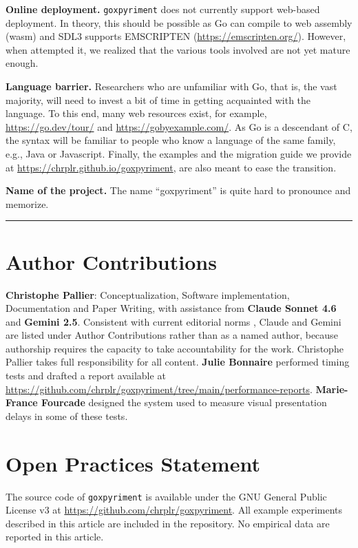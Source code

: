 \documentclass[jou,a4paper]{apa7}
\begin{document}
\textbf{Online deployment.} \texttt{goxpyriment} does not currently
support web-based deployment. In theory, this should be possible as Go
can compile to web assembly (wasm) and SDL3 supports EMSCRIPTEN
(\url{https://emscripten.org/}). However, when attempted it, we realized that
the various tools involved are not yet mature enough.

\textbf{Language barrier.}  Researchers who are unfamiliar with Go,
that is, the vast majority, will need to invest a bit of time in
getting acquainted with the language.  To this end, many web resources
exist, for example, \url{https://go.dev/tour/} and
\url{https://gobyexample.com/}. As Go is a descendant of C, the syntax
will be familiar to people who know a language of the same family,
e.g., Java or Javascript. Finally, the examples and the migration guide
we provide at \url{https://chrplr.github.io/goxpyriment}, are also
meant to ease the transition.

\textbf{Name of the project.} The name ``goxpyriment'' is quite hard to
pronounce and memorize.


\begin{center}\rule{0.5\linewidth}{0.5pt}\end{center}

\section{Author Contributions}\label{author-contributions}

\textbf{Christophe Pallier}: Conceptualization, Software
implementation, Documentation and Paper Writing, with assistance from
\textbf{Claude Sonnet 4.6} and \textbf{Gemini 2.5}. Consistent with
current editorial norms \parencite{natureportfolio2023,
  springernature2023}, Claude and Gemini are listed under Author
Contributions rather than as a named author, because authorship
requires the capacity to take accountability for the work.  Christophe
Pallier takes full responsibility for all content. \textbf{Julie
  Bonnaire} performed timing tests and drafted a report available at
\url{https://github.com/chrplr/goxpyriment/tree/main/performance-reports}.
\textbf{Marie-France Fourcade} designed the system used to measure
visual presentation delays in some of these tests.

\section{Open Practices Statement}\label{open-practices-statement}

The source code of \texttt{goxpyriment} is available under the GNU
General Public License v3 at
\url{https://github.com/chrplr/goxpyriment}. All example experiments
described in this article are included in the repository. No empirical
data are reported in this article.

\printbibliography
\end{document}

